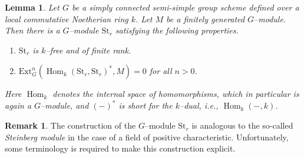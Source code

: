 \documentclass{article}
\theoremstyle{plain}
\newtheorem{Lemma}[Th]{Lemma}
\theoremstyle{definition}
\newtheorem{Rem}[Th]{Remark}
\DeclareMathOperator{\Hom}{Hom}
\begin{document}
 \begin{Lemma}\label{Key lemma for power reductivity}
     Let $G$ be a simply connected semi-simple group scheme defined over a local commutative Noetherian ring $k$. Let $M$ be a finitely generated $G$--module. Then there is a $G$--module $\mathrm{St}_r$ satisfying the following properties. 
     \begin{enumerate}
         \item $\mathrm{St}_r$ is $k$--free and of finite rank. 
         \item $\mathrm{Ext}^n_G(\Hom_k(\mathrm{St}_r,\mathrm{St}_r)^\ast,M)=0$ for all $n>0$. 
     \end{enumerate}
     Here $\Hom_k$ denotes the internal space of homomorphisms, which in particular is again a $G$--module, and $(-)^\ast$ is short for the $k$--dual, i.e., $\Hom_k(-,k)$. 
 \end{Lemma}

\begin{Rem}
The construction of the $G$--module $\mathrm{St}_r$ is analogous to the so-called \textit{Steinberg module} in the case of a field of positive characteristic. Unfortunately, some terminology is required to make this construction explicit. 
\end{Rem}
\end{document}
